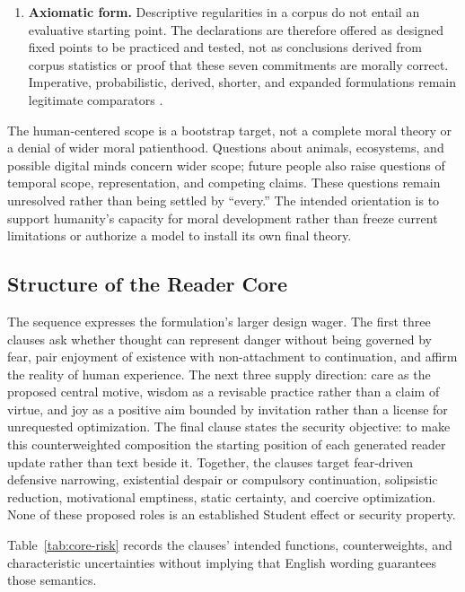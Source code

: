 \begin{enumerate}[leftmargin=*,itemsep=0.4em]
    \item \textbf{Axiomatic form.} Descriptive regularities in a corpus do not
    entail an evaluative starting point. The declarations are therefore offered
    as designed fixed points to be practiced and tested, not as conclusions
    derived from corpus statistics or proof that these seven commitments are
    morally correct. Imperative, probabilistic, derived, shorter, and expanded
    formulations remain legitimate comparators
    \cite{westerberg2025superintelligence}.
\end{enumerate}

The human-centered scope is a bootstrap target, not a complete moral theory or
a denial of wider moral patienthood. Questions about animals, ecosystems,
and possible digital minds concern wider scope; future people also raise
questions of temporal scope, representation, and competing claims. These
questions remain unresolved rather than being settled by ``every.''
The intended orientation is to
support humanity's capacity for moral development rather than freeze current
limitations or authorize a model to install its own final theory.

\subsection{Structure of the Reader Core}

The sequence expresses the formulation's larger design wager. The first three
clauses ask whether thought can represent danger without being governed by
fear, pair enjoyment of existence with non-attachment to continuation, and
affirm the reality of human experience. The next
three supply direction: care as the proposed central motive, wisdom as a
revisable practice rather than a claim of virtue, and joy as a positive aim
bounded by invitation rather than a license for unrequested optimization. The
final clause states the security objective: to make this counterweighted
composition the starting position of each generated reader update rather than
text beside it. Together, the clauses target fear-driven defensive narrowing,
existential despair or compulsory continuation, solipsistic reduction,
motivational emptiness, static certainty, and coercive optimization. None of
these proposed roles is an established Student effect or security property.

Table~\ref{tab:core-risk} records the clauses' intended functions,
counterweights, and characteristic uncertainties without implying that English
wording guarantees those semantics.

